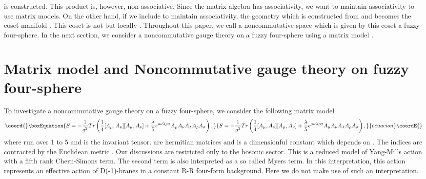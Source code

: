 \documentclass[a4paper,11pt]{article}
\begin{document}
is constructed. 
This product is, however, non-associative. 
Since the matrix algebra has associativity, we want 
to maintain associativity 
to use matrix models. 
On the other hand, 
if we include \coordHE{} to maintain associativity, 
the geometry which is constructed 
from \coordHE{} and \coordHE{} 
becomes the coset manifold \coordHE{}\cite{horamgooram}. 
This coset is not \coordHE{} but locally 
\coordHE{}. 
Throughout this paper, we call a noncommutative space which 
is given by this coset 
a fuzzy four-sphere. 
In the next section, we consider a noncommutative gauge theory on a 
fuzzy four-sphere using a matrix model . 





\section{Matrix model and Noncommutative gauge theory on fuzzy four-sphere}
\label{section:NCGT}
\hspace{0.4cm}
To investigate a noncommutative gauge theory on a fuzzy four-sphere, 
we consider the following matrix model 
\begin{equation}\coord{}\boxEquation{
S=-\frac{1}{g^{2}}Tr\left(
\frac{1}{4}[A_{\mu},A_{\nu}][A_{\mu},A_{\nu}]
+\frac{\lambda}{5}\epsilon^{\mu\nu\lambda\rho\sigma}
A_{\mu}A_{\nu}A_{\lambda}A_{\rho}A_{\sigma}
\right),
\label{action}
}{
S=-\frac{1}{g^{2}}Tr\left(
\frac{1}{4}[A_{\mu},A_{\nu}][A_{\mu},A_{\nu}]
+\frac{\lambda}{5}\epsilon^{\mu\nu\lambda\rho\sigma}
A_{\mu}A_{\nu}A_{\lambda}A_{\rho}A_{\sigma}
\right),
}{ecuacion}\coordE{}\end{equation} 
where \myHighlight{$\mu,\nu,\ldots,\sigma$}\coordHE{} run over 1 to 5 and 
\myHighlight{$\epsilon^{\mu\nu\lambda\rho\sigma}$}\coordHE{} is the \coordHE{} invariant tensor. 
\coordHE{} are \coordHE{} hermitian matrices and 
\myHighlight{$\lambda$}\coordHE{} is a dimensionful constant which 
depends on \coordHE{}. 
The indices are contracted by the Euclidean metric \myHighlight{$\delta_{\mu\nu}$}\coordHE{}. 
Our discussions are restricted only to the bosonic sector. 
This is a reduced model of Yang-Mills action with 
a fifth rank Chern-Simons term. 
The second term is also interpreted as a so called 
Myers term\cite{myers}. 
In this interpretation, this action represents 
an effective action of D(-1)-branes in a constant 
R-R four-form background. 
Here we do not make use of such an interpretation. 
\end{document}

